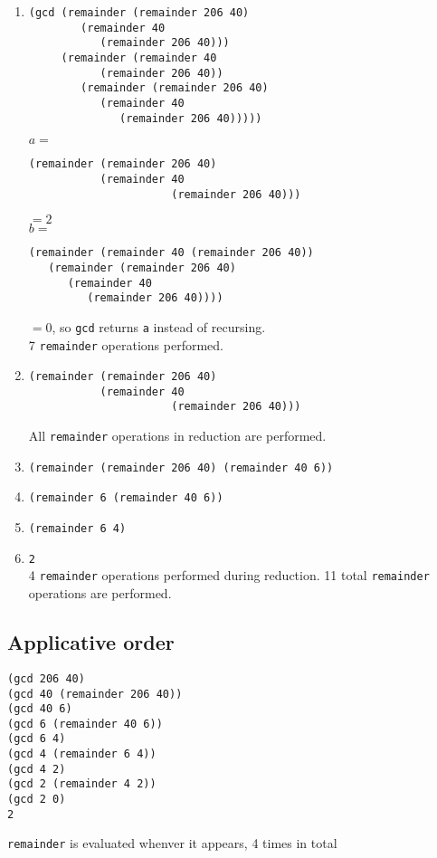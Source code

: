 \documentclass{article}
\begin{document}
\begin{enumerate}
    \item
        \begin{lstlisting}
(gcd (remainder (remainder 206 40)
        (remainder 40
           (remainder 206 40)))
     (remainder (remainder 40
           (remainder 206 40))
        (remainder (remainder 206 40)
           (remainder 40
              (remainder 206 40)))))
        \end{lstlisting}
        $a=$
        \begin{lstlisting}
(remainder (remainder 206 40)
           (remainder 40
                      (remainder 206 40)))
        \end{lstlisting}
        $=2$\\

        $b=$\\
        \begin{lstlisting}
(remainder (remainder 40 (remainder 206 40))
   (remainder (remainder 206 40)
      (remainder 40
         (remainder 206 40))))
        \end{lstlisting}
        $=0$, so \texttt{gcd} returns \texttt{a} instead of recursing.\\
        7 \texttt{remainder} operations performed.

    \item
        \begin{lstlisting}
(remainder (remainder 206 40)
           (remainder 40
                      (remainder 206 40)))
        \end{lstlisting}
        All \texttt{remainder} operations in reduction are performed.

    \item \lstinline|(remainder (remainder 206 40) (remainder 40 6))|
    \item \lstinline|(remainder 6 (remainder 40 6))|
    \item \lstinline|(remainder 6 4)|
    \item \lstinline|2|\\
        4 \texttt{remainder} operations performed during reduction. 11 total
        \texttt{remainder} operations are performed.
\end{enumerate}

\subsection{Applicative order}
\begin{lstlisting}
(gcd 206 40)
(gcd 40 (remainder 206 40))
(gcd 40 6)
(gcd 6 (remainder 40 6))
(gcd 6 4)
(gcd 4 (remainder 6 4))
(gcd 4 2)
(gcd 2 (remainder 4 2))
(gcd 2 0)
2
\end{lstlisting}
\texttt{remainder} is evaluated whenver it appears, 4 times in total
\end{document}
